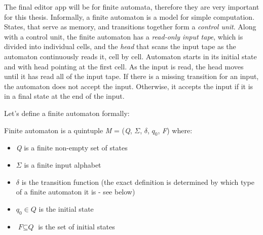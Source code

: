 The final editor app will be for finite automata, therefore they are very important for this thesis. Informally, a finite automaton is a model for simple computation. States, that serve as memory, and transitions together form a \textit{control unit}. Along with a control unit, the finite automaton has a \textit{read-only input tape}, which is divided into individual cells, and the \textit{head} that scans the input tape as the automaton continuously reads it, cell by cell. Automaton starts in its initial state and with head pointing at the first cell. As the input is read, the head moves until it has read all of the input tape. If there is a missing transition for an input, the automaton does not accept the input. Otherwise, it accepts the input if it is in a final state at the end of the input.

Let's define a finite automaton formally:
\begin{definition}
    Finite automaton is a quintuple \textit{M} = (\textit{Q}, $\Sigma$, $\delta$, $\textit{q}_0$, \textit{F}) where:
    \begin{itemize}
        \item \textit{Q} is a finite non-empty set of states
        \item $\Sigma$ is a finite input alphabet
        \item $\delta$ is the transition function (the exact definition is determined by which type of a finite automaton it is - see below)
        \item $\textit{q}_0 \in \textit{Q}$ is the initial state
        \item $\textit{F} \subseteq \textit{Q}$ is the set of initial states
    \end{itemize}
\end{definition}


